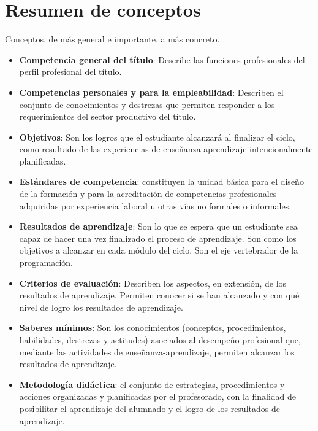 
\section{Resumen de conceptos}

Conceptos, de más general e importante, a más concreto.
\begin{itemize}

\item {}
\textbf{Competencia general del título}: Describe las funciones profesionales del perfil profesional del título. 

\item {}
\textbf{Competencias personales y para la empleabilidad}: Describen el conjunto de conocimientos y destrezas que permiten responder a los requerimientos del sector productivo del título. 

\item {}
\textbf{Objetivos}: Son los logros que el estudiante alcanzará al finalizar el ciclo, como resultado de las experiencias de enseñanza-aprendizaje intencionalmente planificadas. 

\item {}
\textbf{Estándares de competencia}: constituyen la unidad básica para el diseño de la formación y para la acreditación de competencias profesionales adquiridas por experiencia laboral u otras vías no formales o informales.

\item {}
\textbf{Resultados de aprendizaje}: Son lo que se espera que un estudiante sea capaz de hacer una vez finalizado el proceso de aprendizaje. Son como los objetivos a alcanzar en cada módulo del ciclo. Son el eje vertebrador de la programación.

\item {}
\textbf{Criterios de evaluación}: Describen los aspectos, en extensión, de los resultados de aprendizaje. Permiten conocer si se han alcanzado y con qué nivel de logro los resultados de aprendizaje. 

\item {}
\textbf{Saberes mínimos}: Son los conocimientos (conceptos, procedimientos, habilidades, destrezas y actitudes) asociados al desempeño profesional que, mediante las actividades de enseñanza-aprendizaje, permiten alcanzar los resultados de aprendizaje. 

\item {}
\textbf{Metodología didáctica}: el conjunto de estrategias, procedimientos y acciones organizadas y planificadas por el profesorado, con la finalidad de posibilitar el aprendizaje del alumnado y el logro de los resultados de aprendizaje.
\end{itemize}
